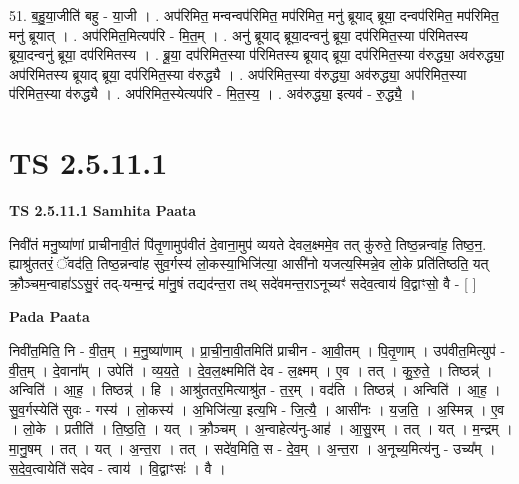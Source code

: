 \documentclass[17pt]{extarticle}
\begin{document}
51. ब॒हु॒या॒जीति॑ बहु - या॒जी । . अप॑रिमित॒ मन्वन्वप॑रिमित॒ मप॑रिमित॒ मनु॑ ब्रूयाद् ब्रूया॒ दन्वप॑रिमित॒ मप॑रिमित॒ मनु॑ ब्रूयात् । . अप॑रिमित॒मित्यप॑रि - मि॒त॒म् । . अनु॑ ब्रूयाद् ब्रूया॒दन्वनु॑ ब्रूया॒ दप॑रिमित॒स्या प॑रिमितस्य ब्रूया॒दन्वनु॑ ब्रूया॒ दप॑रिमितस्य । . ब्रू॒या॒ दप॑रिमित॒स्या प॑रिमितस्य ब्रूयाद् ब्रूया॒ दप॑रिमित॒स्या व॑रुद्ध्या॒ अव॑रुद्ध्या॒ अप॑रिमितस्य ब्रूयाद् ब्रूया॒ दप॑रिमित॒स्या व॑रुद्ध्यै । . अप॑रिमित॒स्या व॑रुद्ध्या॒ अव॑रुद्ध्या॒ अप॑रिमित॒स्या प॑रिमित॒स्या व॑रुद्ध्यै । . अप॑रिमित॒स्येत्यप॑रि - मि॒त॒स्य॒ । . अव॑रुद्ध्या॒ इत्यव॑ - रु॒द्ध्यै॒ । \newline
\pagebreak
{}
\section*{ TS 2.5.11.1 }

\textbf{TS 2.5.11.1 } \newline
\textbf{Samhita Paata} \newline

निवी॑तं मनु॒ष्या॑णां प्राचीनावी॒तं पि॑तृ॒णामुप॑वीतं दे॒वाना॒मुप॑ व्ययते देवल॒क्ष्ममे॒व तत् कु॑रुते॒ तिष्ठ॒न्नन्वा॑ह॒ तिष्ठ॒न॒. ह्याश्रु॑ततरं॒ ॅवद॑ति॒ तिष्ठ॒न्नन्वा॑ह सुव॒र्गस्य॑ लो॒कस्या॒भिजि॑त्या॒ आसी॑नो यजत्य॒स्मिन्ने॒व लो॒के प्रति॑तिष्ठति॒ यत् क्रौ॒ञ्चम॒न्वाहा॑ऽऽसु॒रं तद्-यन्म॒न्द्रं मा॑नु॒षं तद्यद॑न्त॒रा तथ् सदे॑वमन्त॒राऽनूच्यꣳ॑ सदेव॒त्वाय॑ वि॒द्वाꣳसो॒ वै - [  ] \newline

\textbf{Pada Paata} \newline

निवी॑त॒मिति॒ नि - वी॒त॒म् । म॒नु॒ष्या॑णाम् । प्रा॒ची॒ना॒वी॒तमिति॑ प्राचीन - आ॒वी॒तम् । पि॒तृ॒णाम् । उप॑वीत॒मित्युप॑ - वी॒त॒म् । दे॒वाना᳚म् । उपेति॑ । व्य॒य॒ते॒ । दे॒व॒ल॒क्ष्ममिति॑ देव - ल॒क्ष्मम् । ए॒व । तत् । कु॒रु॒ते॒ । तिष्ठन्न्॑ । अन्विति॑ । आ॒ह॒ । तिष्ठन्न्॑ । हि । आश्रु॑ततर॒मित्याश्रु॑त - त॒र॒म् । वद॑ति । तिष्ठन्न्॑ । अन्विति॑ । आ॒ह॒ । सु॒व॒र्गस्येति॑ सुवः - गस्य॑ । लो॒कस्य॑ । अ॒भिजि॑त्या॒ इत्य॒भि - जि॒त्यै॒ । आसी॑नः । य॒ज॒ति॒ । अ॒स्मिन्न् । ए॒व । लो॒के । प्रतीति॑ । ति॒ष्ठ॒ति॒ । यत् । क्रौ॒ञ्चम् । अ॒न्वाहेत्य॑नु-आह॑ । आ॒सु॒रम् । तत् । यत् । म॒न्द्रम् । मा॒नु॒षम् । तत् । यत् । अ॒न्त॒रा । तत् । सदे॑व॒मिति॒ स - दे॒व॒म् । अ॒न्त॒रा । अ॒नूच्य॒मित्य॑नु - उच्य᳚म् । स॒दे॒व॒त्वायेति॑ सदेव - त्वाय॑ । वि॒द्वाꣳसः॑ । वै ।  \newline
\end{document}
